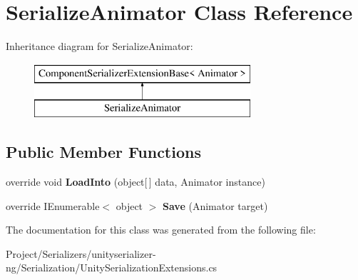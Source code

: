 \hypertarget{class_serialize_animator}{}\section{Serialize\+Animator Class Reference}
\label{class_serialize_animator}
Inheritance diagram for Serialize\+Animator\+:\begin{figure}[H]
\begin{center}
\leavevmode
\includegraphics[height=2.000000cm]{class_serialize_animator}
\end{center}
\end{figure}
\subsection*{Public Member Functions}
\begin{DoxyCompactItemize}
\item 
\mbox{\label{class_serialize_animator_a8fcc5dfd72a04ceb6d729ead95007ef2}} 
override void {\bfseries Load\+Into} (object\mbox{[}$\,$\mbox{]} data, Animator instance)
\item 
\mbox{\label{class_serialize_animator_a1b0623fd6936bdb19d45bca748e3a7d8}} 
override I\+Enumerable$<$ object $>$ {\bfseries Save} (Animator target)
\end{DoxyCompactItemize}


The documentation for this class was generated from the following file\+:\begin{DoxyCompactItemize}
\item 
Project/\+Serializers/unityserializer-\/ng/\+Serialization/Unity\+Serialization\+Extensions.\+cs\end{DoxyCompactItemize}
